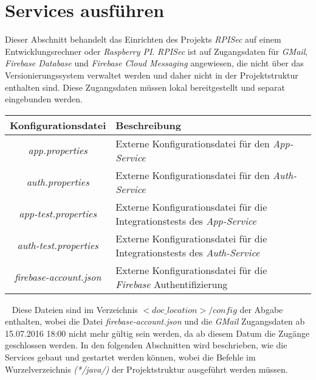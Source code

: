 \documentclass[]{article}
\begin{document}
\section{Services ausführen}
Dieser Abschnitt behandelt das Einrichten des Projekts \emph{RPISec} auf einem Entwicklungsrechner oder \emph{Raspberry PI}. \emph{RPISec} ist auf Zugangsdaten für \emph{GMail}, \emph{Firebase Database} und \emph{Firebase Cloud Messaging} angewiesen, die nicht über das Versionierungssystem verwaltet werden und daher nicht in der Projektstruktur enthalten sind. Diese Zugangsdaten müssen lokal bereitgestellt und separat eingebunden werden.
{\renewcommand{\arraystretch}{2}%
\begin{center}
	\begin{tabular}{| c | l | p{7cm} |}
		\hline
		\textbf{Konfigurationsdatei} & \textbf{Beschreibung}  \\ \hline
		\textit{app.properties} & Externe Konfigurationsdatei für den \emph{App-Service} \\ \hline
		\textit{auth.properties} & Externe Konfigurationsdatei für den \emph{Auth-Service} \\ \hline
		\textit{app-test.properties} & Externe Konfigurationsdatei für die Integrationstests des \emph{App-Service} \\ \hline
		\textit{auth-test.properties} & Externe Konfigurationsdatei für die Integrationstests des \emph{Auth-Service} \\ \hline
		\textit{firebase-account.json} & Externe Konfigurationsdatei für die \emph{Firebase} Authentifizierung \\ \hline
	\end{tabular}
\end{center}
\ \newline
Diese Dateien sind im Verzeichnis \emph{$<doc\_location>/config$} der Abgabe enthalten, wobei die Datei \emph{firebase-account.json} und die \emph{GMail} Zugangsdaten ab 15.07.2016 18:00 nicht mehr gültig sein werden, da ab diesem Datum die Zugänge geschlossen werden.
\newline
\newline
In den folgenden Abschnitten wird beschrieben, wie die Services gebaut und gestartet werden können, wobei die Befehle im Wurzelverzeichnis \emph{(*/java/)} der Projektstruktur ausgeführt werden müssen.
\newpage

}
\end{document}
